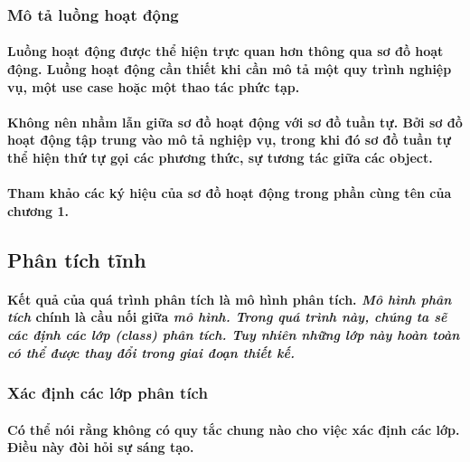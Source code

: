 \documentclass{article}
\begin{document}
    \subsubsection{Mô tả luồng hoạt động}
      
      \paragraph{\textnormal{
        Luồng hoạt động được thể hiện trực quan hơn thông qua sơ đồ hoạt động. Luồng hoạt động cần thiết khi cần mô tả một quy trình nghiệp vụ, một use case hoặc một thao tác phức tạp.
      }}

      \paragraph{\textnormal{
        Không nên nhầm lẫn giữa sơ đồ hoạt động với sơ đồ tuần tự. Bởi sơ đồ hoạt động tập trung vào mô tả nghiệp vụ, trong khi đó sơ đồ tuần tự thể hiện thứ tự gọi các phương thức, sự tương tác giữa các object.
      }}

      \paragraph{\textnormal{
        Tham khảo các ký hiệu của sơ đồ hoạt động trong phần cùng tên của chương 1.
      }}

  \subsection{Phân tích tĩnh}
    \paragraph{\textnormal{
      Kết quả của quá trình phân tích là mô hình phân tích. \textit{Mô hình phân tích} chính là cầu nối giữa \textit{mô hình. Trong quá trình này, chúng ta sẽ các định các lớp (class) phân tích. Tuy nhiên những lớp này hoàn toàn có thể được thay đổi trong giai đoạn thiết kế.}
    }}
    \subsubsection{Xác định các lớp phân tích}
      \paragraph{\textnormal{
        Có thể nói rằng không có quy tắc chung nào cho việc xác định các lớp. Điều này đòi hỏi sự sáng tạo.
      }}
\end{document}
